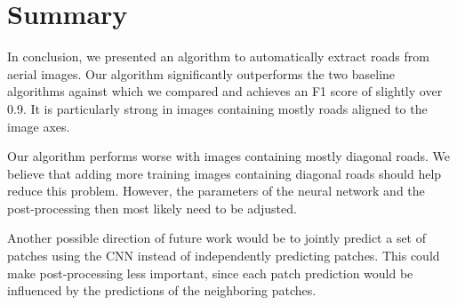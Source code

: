 \documentclass[10pt,conference,compsocconf]{IEEEtran}
\begin{document}
\section{Summary}
\label{sec:summary}
In conclusion, we presented an algorithm to automatically extract roads from aerial images. Our algorithm significantly outperforms the two baseline algorithms against which we compared and achieves an F1 score of slightly over 0.9. It is particularly strong in images containing mostly roads aligned to the image axes.

\par 
Our algorithm performs worse with images containing mostly diagonal roads. We believe that adding more training images containing diagonal roads should help reduce this problem. However, the parameters of the neural network and the post-processing then most likely need to be adjusted. 

\par 
Another possible direction of future work would be to jointly predict a set of patches using the CNN instead of independently predicting patches. This could make post-processing less important, since each patch prediction would be influenced by the predictions of the neighboring patches. 



\end{document}
